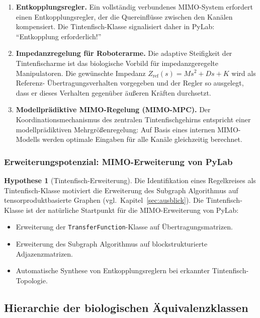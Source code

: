 \documentclass[a4paper,12pt]{article}
\theoremstyle{definition}
\newtheorem{hypothese}{Hypothese}
\begin{document}
\begin{enumerate}
	\item \textbf{Entkopplungsregler.}
	Ein vollständig verbundenes MIMO-System erfordert einen
	Entkopplungsregler, der die Quereinflüsse zwischen den Kanälen
	kompensiert. Die Tintenfisch-Klasse signalisiert daher in PyLab:
	``Entkopplung erforderlich!''
	
	\item \textbf{Impedanzregelung für Roboterarme.}
	Die adaptive Steifigkeit der Tintenfischarme ist das biologische
	Vorbild für impedanzgeregelte Manipulatoren. Die gewünschte
	Impedanz $Z_{\text{ref}}(s) = M s^2 + D s + K$ wird als Referenz-
	Übertragungsverhalten vorgegeben und der Regler so ausgelegt, dass
	er dieses Verhalten gegenüber äußeren Kräften durchsetzt.
	
	\item \textbf{Modellprädiktive MIMO-Regelung (MIMO-MPC).}
	Der Koordinationsmechanismus des zentralen Tintenfischgehirns
	entspricht einer modellprädiktiven Mehrgrößenregelung: Auf Basis
	eines internen MIMO-Modells werden optimale Eingaben für alle
	Kanäle gleichzeitig berechnet.
\end{enumerate}

\subsubsection{Erweiterungspotenzial: MIMO-Erweiterung von PyLab}

\begin{hypothese}[Tintenfisch-Erweiterung]
	Die Identifikation eines Regelkreises als Tinten\-fisch-Klasse motiviert die
	Erweiterung des Subgraph Algorithmus auf tensorproduktbasierte
	Graphen (vgl.\ Kapitel~\ref{sec:ausblick}). Die Tintenfisch-Klasse ist
	der natürliche Startpunkt für die MIMO-Erweiterung von PyLab:
	\begin{itemize}
		\item Erweiterung der \texttt{TransferFunction}-Klasse auf
		Übertragungsmatrizen.
		\item Erweiterung des Subgraph Algorithmus auf blockstrukturierte
		Adjazenzmatrizen.
		\item Automatische Synthese von Entkopplungsreglern bei erkannter
		Tintenfisch-Topologie.
	\end{itemize}
\end{hypothese}

\subsection{Hierarchie der biologischen Äquivalenzklassen}
\label{subsec:bio_hierarchie}
\end{document}
